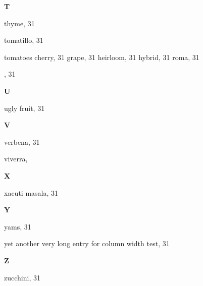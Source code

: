\begin{theindex}
  \indexspace
{\sffamily\bfseries{T}}\nopagebreak

  \item thyme, 31
  \item tomatillo, 31
  \item tomatoes
    \subitem cherry, 31
    \subitem grape, 31
    \subitem heirloom, 31
    \subitem hybrid, 31
    \subitem roma, 31
  \item {}, 31

  \indexspace
{\sffamily\bfseries{U}}\nopagebreak

  \item ugly fruit, 31

  \indexspace
{\sffamily\bfseries{V}}\nopagebreak

  \item verbena, 31
  \item viverra, 

  \indexspace
{\sffamily\bfseries{X}}\nopagebreak

  \item xacuti masala, 31

  \indexspace
{\sffamily\bfseries{Y}}\nopagebreak

  \item yams, 31
  \item yet another very long entry for column width test, 31

  \indexspace
{\sffamily\bfseries{Z}}\nopagebreak

  \item zucchini, 31

\end{theindex}
